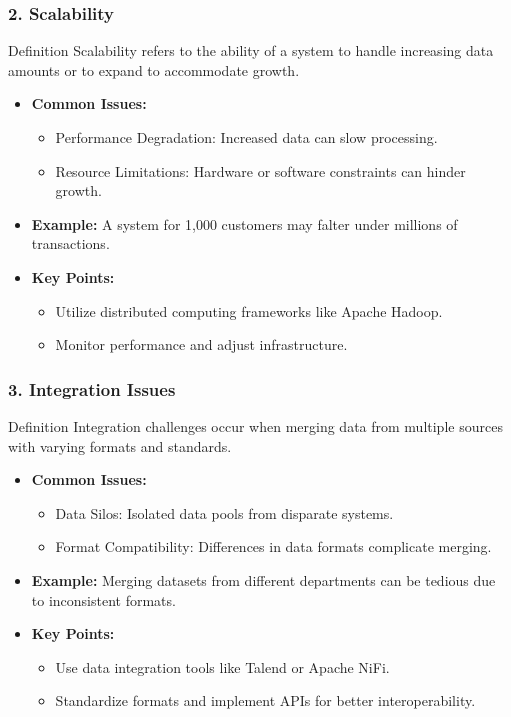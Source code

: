 \documentclass[aspectratio=169]{beamer}
\begin{document}
\begin{frame}
    \frametitle{2. Scalability}
    \begin{block}{Definition}
        Scalability refers to the ability of a system to handle increasing data amounts or to expand to accommodate growth.
    \end{block}
    \begin{itemize}
        \item \textbf{Common Issues:}
        \begin{itemize}
            \item Performance Degradation: Increased data can slow processing.
            \item Resource Limitations: Hardware or software constraints can hinder growth.
        \end{itemize}
        \item \textbf{Example:}
            A system for 1,000 customers may falter under millions of transactions.
        \item \textbf{Key Points:}
        \begin{itemize}
            \item Utilize distributed computing frameworks like Apache Hadoop.
            \item Monitor performance and adjust infrastructure.
        \end{itemize}
    \end{itemize}
\end{frame}

\begin{frame}
    \frametitle{3. Integration Issues}
    \begin{block}{Definition}
        Integration challenges occur when merging data from multiple sources with varying formats and standards.
    \end{block}
    \begin{itemize}
        \item \textbf{Common Issues:}
        \begin{itemize}
            \item Data Silos: Isolated data pools from disparate systems.
            \item Format Compatibility: Differences in data formats complicate merging.
        \end{itemize}
        \item \textbf{Example:}
            Merging datasets from different departments can be tedious due to inconsistent formats.
        \item \textbf{Key Points:}
        \begin{itemize}
            \item Use data integration tools like Talend or Apache NiFi.
            \item Standardize formats and implement APIs for better interoperability.
        \end{itemize}
    \end{itemize}
\end{frame}
\end{document}
